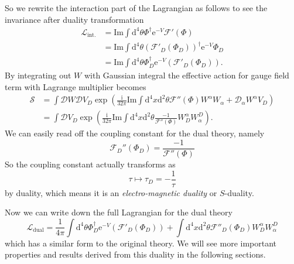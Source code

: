 \documentclass{article}
\begin{document}
So we rewrite the interaction part of the Lagrangian as follows to see the invariance after duality transformation
\begin{equation}
\begin{aligned}
   \mathscr{L}_{\mathrm{int.}}&=\mathrm{Im}\int\mathrm{d}^{4} \theta\Phi^{\dagger}\mathrm{e}^{-V}\mathscr{F}'(\Phi)\\
   &=\mathrm{Im}\int\mathrm{d}^{4} \theta(\mathscr{F}'_D(\Phi_D))^{\dagger}\mathrm{e}^{-V}\Phi_D\\
   &=\mathrm{Im}\int\mathrm{d}^{4}\theta \Phi_D^{\dagger}\mathrm{e}^{-V}(\mathscr{F}'_D(\Phi_D)).
\end{aligned}
\end{equation}
By integrating out $W$ with Gaussian integral the effective action for gauge field term with Lagrange multiplier becomes
\begin{equation}
    \begin{aligned}
       \mathcal{S}&=\int\mathcal{D}W\mathcal{D}V_D \exp(\frac{\mathrm{i}}{32\pi}\mathrm{Im}\int\mathrm{d}^{4}x\mathrm{d}^{2}\theta\mathscr{F}''(\Phi)W^{\alpha}W_{\alpha}+\mathscr{D}_{\alpha}W^{\alpha}V_D)\\
       &=\int\mathcal{D}V_D \exp(\frac{\mathrm{i}}{32\pi}\mathrm{Im}\int\mathrm{d}^{4}x\mathrm{d}^{2}\theta\frac{-1}{\mathscr{F}''(\Phi)}W_D^{\alpha}W^D_{\alpha}).
    \end{aligned}
\end{equation}
We can easily read off the coupling constant for the dual theory, namely 
\begin{equation}
    \mathscr{F}_D''(\Phi_D)=\frac{-1}{\mathscr{F}''(\Phi)}
\end{equation}
So the coupling constant actually transforms as
\begin{equation}
    \tau\mapsto\tau_D=-\frac{1}{\tau}
\end{equation}
by duality, which means it is an \textit{electro-magnetic duality} or $S$-duality.

Now we can write down the full Lagrangian for the dual theory 
\begin{equation}
\mathscr{L}_{\mathrm{dual}}=\frac{1}{4\pi}\int\mathrm{d}^{4}\theta \Phi_D^{\dagger}\mathrm{e}^{-V}(\mathscr{F}'_D(\Phi_D))+\int\mathrm{d}^{4}x\mathrm{d}^{2}\theta\mathscr{F}''_D(\Phi_D)W_D^{\alpha}W^D_{\alpha}
\end{equation}
which has a similar form to the original theory. We will see more important properties and results derived from this duality in the following sections.
\end{document}
